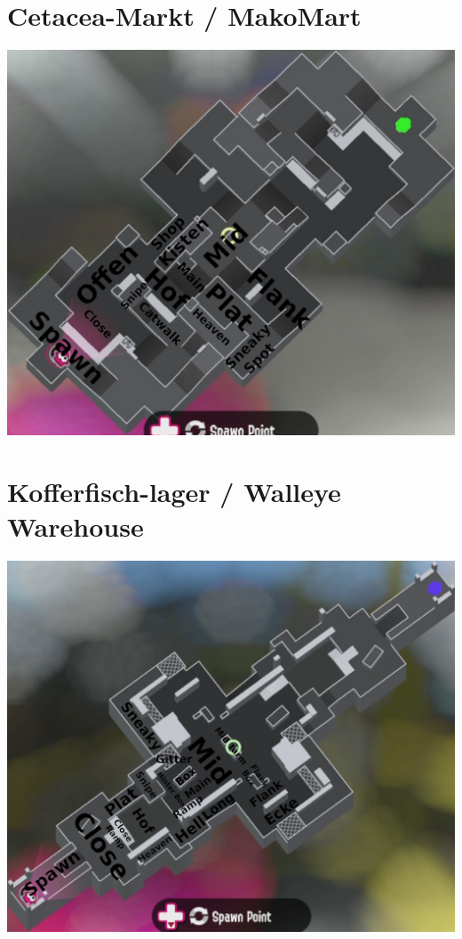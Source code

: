 \documentclass{scrreprt}
\begin{document}
\section{Cetacea-Markt / MakoMart}
\includegraphics[width=\linewidth]{img/makomart.png}
\section{Kofferfisch-lager / Walleye Warehouse}
\includegraphics[width=\linewidth]{img/walleyewarehouse.png}
\end{document}
